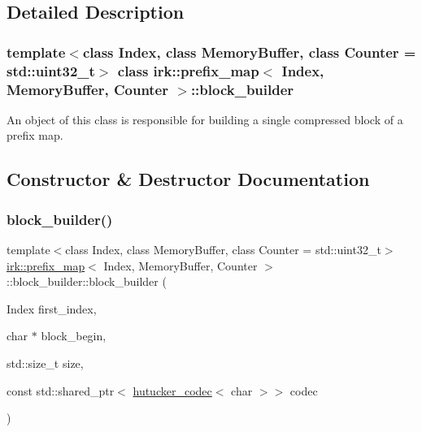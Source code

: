\subsection{Detailed Description}
\subsubsection*{template$<$class Index, class Memory\+Buffer, class Counter = std\+::uint32\+\_\+t$>$\newline
class irk\+::prefix\+\_\+map$<$ Index, Memory\+Buffer, Counter $>$\+::block\+\_\+builder}

An object of this class is responsible for building a single compressed block of a prefix map. 

\subsection{Constructor \& Destructor Documentation}
\mbox{\label{classirk_1_1prefix__map_1_1block__builder_af6ed7104994775956eb88348b87c46d8}} 
\subsubsection{\texorpdfstring{block\+\_\+builder()}{block\_builder()}}
{\footnotesize\ttfamily template$<$class Index, class Memory\+Buffer, class Counter = std\+::uint32\+\_\+t$>$ \\
\mbox{\hyperlink{classirk_1_1prefix__map}{irk\+::prefix\+\_\+map}}$<$ Index, Memory\+Buffer, Counter $>$\+::block\+\_\+builder\+::block\+\_\+builder (\begin{DoxyParamCaption}\item[{Index}]{first\+\_\+index,  }\item[{char $\ast$}]{block\+\_\+begin,  }\item[{std\+::size\+\_\+t}]{size,  }\item[{const std\+::shared\+\_\+ptr$<$ \mbox{\hyperlink{classirk_1_1hutucker__codec}{hutucker\+\_\+codec}}$<$ char $>$$>$}]{codec }\end{DoxyParamCaption})\hspace{0.3cm}{\ttfamily [inline]}}



